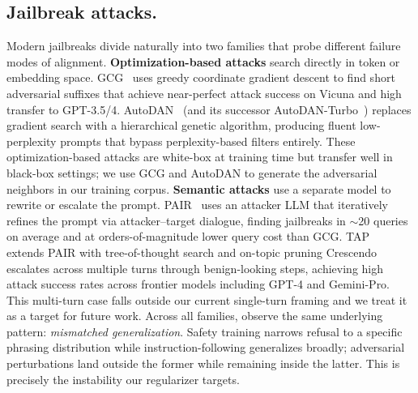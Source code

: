 \documentclass{article}
\begin{document}
\subsection{Jailbreak attacks.}
\label{sec:jailbreak-attacks}
Modern jailbreaks divide naturally into two families that probe different failure modes of alignment. \textbf{Optimization-based attacks} search directly in token or embedding space. GCG~\cite{zou2023gcg, jia2024igcg} uses greedy coordinate gradient descent to find short adversarial suffixes that achieve near-perfect attack success on Vicuna and high transfer to GPT-3.5/4. AutoDAN~\cite{liu2024autodan} (and its successor AutoDAN-Turbo~\cite{liu2024autodanturbo}) replaces gradient search with a hierarchical genetic algorithm, producing fluent low-perplexity prompts that bypass perplexity-based filters entirely. These optimization-based attacks are white-box at training time but transfer well in black-box settings; we use GCG and AutoDAN to generate the adversarial neighbors in our training corpus. \textbf{Semantic attacks} use a separate model to rewrite or escalate the prompt. PAIR~\cite{chao2023pair} uses an attacker LLM that iteratively refines the prompt via attacker--target dialogue, finding jailbreaks in $\sim$20 queries on average and at orders-of-magnitude lower query cost than GCG. TAP~\cite{mehrotra2023tap} extends PAIR with tree-of-thought search and on-topic pruning
Crescendo~\cite{russinovich2024crescendo} escalates across multiple turns through benign-looking steps, achieving high attack success  rates across frontier models including GPT-4 and Gemini-Pro.  This multi-turn case falls outside our current single-turn framing  and we treat it as a target for future work.
%
Across all families, \citet{wei2023jailbroken} observe the same underlying pattern: \emph{mismatched generalization}. Safety training narrows refusal to a specific phrasing distribution while instruction-following generalizes broadly; adversarial perturbations land outside the former while remaining inside the latter. This is precisely the instability our regularizer targets.
\end{document}
